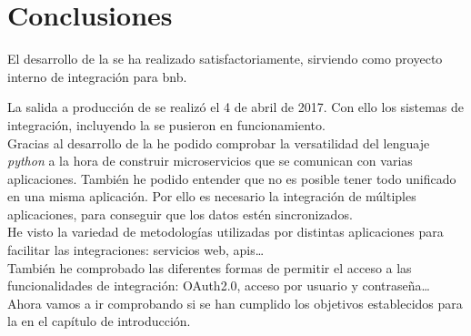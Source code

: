 \chapter{Conclusiones}

El desarrollo de la \iface{} se ha realizado satisfactoriamente, sirviendo como proyecto interno de integración para \acrshort{bnb}.

La salida a producción de \wday{} se realizó el 4 de abril de 2017. Con ello los sistemas de integración, incluyendo la \iface{} se pusieron en funcionamiento.\\



Gracias al desarrollo de la \iface{} he podido comprobar la versatilidad del lenguaje \textit{python} a la hora de construir microservicios que se comunican con varias aplicaciones.
También he podido entender que no es posible tener todo unificado en una misma aplicación. Por ello es necesario la integración de múltiples aplicaciones, para conseguir que los datos estén sincronizados.\\

He visto la variedad de metodologías utilizadas por distintas aplicaciones para facilitar las integraciones: servicios web, \acrshort{api}s\ldots\\

También he comprobado las diferentes formas de permitir el acceso a las funcionalidades de integración: OAuth2.0, acceso por usuario y contraseña\ldots\\





Ahora vamos a ir comprobando si se han cumplido los objetivos establecidos para la \iface{} en el capítulo de introducción.

